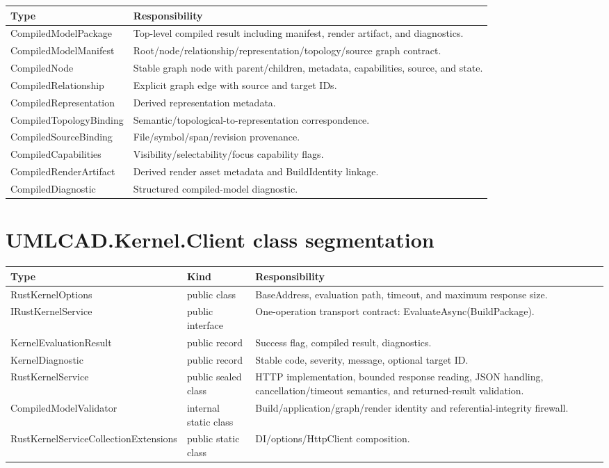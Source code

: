 \documentclass[11pt,a4paper]{report}
\begin{document}
\begin{longtable}{@{}p{}p{}@{}}
\toprule
Type & Responsibility \\
\midrule
CompiledModelPackage & Top-level compiled result including manifest, render artifact, and diagnostics. \\
CompiledModelManifest & Root/node/relationship/representation/topology/source graph contract. \\
CompiledNode & Stable graph node with parent/children, metadata, capabilities, source, and state. \\
CompiledRelationship & Explicit graph edge with source and target IDs. \\
CompiledRepresentation & Derived representation metadata. \\
CompiledTopologyBinding & Semantic/topological-to-representation correspondence. \\
CompiledSourceBinding & File/symbol/span/revision provenance. \\
CompiledCapabilities & Visibility/selectability/focus capability flags. \\
CompiledRenderArtifact & Derived render asset metadata and BuildIdentity linkage. \\
CompiledDiagnostic & Structured compiled-model diagnostic. \\
\bottomrule
\end{longtable}

\section{UMLCAD.Kernel.Client class segmentation}

\begin{longtable}{@{}p{}p{}p{}@{}}
\toprule
Type & Kind & Responsibility \\
\midrule
RustKernelOptions & public class & BaseAddress, evaluation path, timeout, and maximum response size. \\
IRustKernelService & public interface & One-operation transport contract: EvaluateAsync(BuildPackage). \\
KernelEvaluationResult & public record & Success flag, compiled result, diagnostics. \\
KernelDiagnostic & public record & Stable code, severity, message, optional target ID. \\
RustKernelService & public sealed class & HTTP implementation, bounded response reading, JSON handling, cancellation/timeout semantics, and returned-result validation. \\
CompiledModelValidator & internal static class & Build/application/graph/render identity and referential-integrity firewall. \\
RustKernelServiceCollectionExtensions & public static class & DI/options/HttpClient composition. \\
\bottomrule
\end{longtable}
\end{document}
